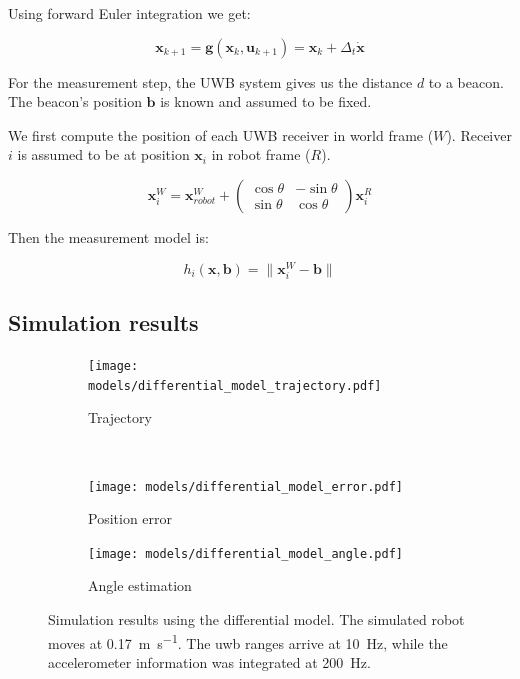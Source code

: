 \documentclass[a4paper, 12pt]{scrreprt}
\begin{document}
Using forward Euler integration we get:

\begin{equation}
    \mathbf{x}_{k+1} = \mathbf{g}(\mathbf{x}_k, \mathbf{u}_{k+1}) = \mathbf{x}_{k} + \Delta_t \mathbf{\dot{x}}
\end{equation}

For the measurement step, the UWB system gives us the distance $d$ to a beacon.
The beacon's position $\mathbf{b}$ is known and assumed to be fixed.

We first compute the position of each UWB receiver in world frame ($W$).
Receiver $i$ is assumed to be at position $\mathbf{x}_{i}$ in robot frame ($R$).

\begin{equation}
\mathbf{x}_{i}^W = \mathbf{x}_{robot}^W + \begin{pmatrix}
\cos \theta & - \sin \theta \\
\sin \theta & \cos \theta
\end{pmatrix} \mathbf{x}_{i}^R
\end{equation}

Then the measurement model is:

\begin{equation}
    h_i(\mathbf{x}, \mathbf{b}) = \lVert \mathbf{x}_i^W - \mathbf{b} \rVert
\end{equation}

\subsection{Simulation results}

\begin{figure}[h!]
    \centering
    \begin{subfigure}[t]{0.4\textwidth}
        \texttt{[image: models/differential\_model\_trajectory.pdf]}
        \caption{Trajectory}
    \end{subfigure}%
    ~
    \begin{subfigure}[t]{0.4\textwidth}
        \texttt{[image: models/differential\_model\_error.pdf]}
        \caption{Position error}
    \end{subfigure}

    \begin{subfigure}[t]{0.4\textwidth}
        \texttt{[image: models/differential\_model\_angle.pdf]}
        \caption{Angle estimation}
    \end{subfigure}

    \caption{Simulation results using the differential model.
        The simulated robot moves at \SI{0.17}{\meter\per\second}.
        The \gls{uwb} ranges arrive at \SI{10}{\hertz}, while the accelerometer information was integrated at \SI{200}{\hertz}.
        \label{fig:differential_model}
    }
\end{figure}
\end{document}
